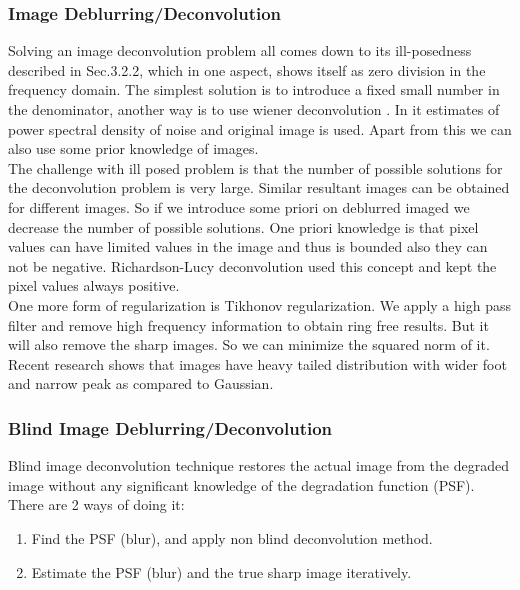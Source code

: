 \documentclass{article}
\begin{document}
\subsubsection{Image Deblurring/Deconvolution}
Solving an image deconvolution problem all comes down to its ill-posedness described in Sec.3.2.2, which in one aspect, shows itself as zero division in the frequency domain. The simplest solution is to introduce a fixed small number in the denominator, another way is to use wiener deconvolution \cite{gonzalez-woods}. In it estimates of power spectral density of noise and original image is used. Apart from this we can also use some prior knowledge of images. \\

The challenge with ill posed problem is that the number of possible solutions for the deconvolution problem is very large. Similar resultant images can be obtained for different images. So if we introduce some priori on deblurred imaged we decrease the number of possible solutions. One priori knowledge is that pixel values can have limited values in the image and thus is bounded also they can not be negative. Richardson-Lucy deconvolution used this concept and kept the pixel values always positive. \\

One more form of regularization is Tikhonov regularization. We apply a high pass filter and remove high frequency information to obtain ring free results. But it will also remove the sharp images. So we can minimize the squared norm of it. Recent research shows that images have heavy tailed distribution with wider foot and narrow peak as compared to Gaussian. \\

\subsubsection{Blind Image Deblurring/Deconvolution}
Blind image deconvolution technique restores the actual image from the degraded image without any significant knowledge of the degradation function (PSF). \\

There are 2 ways of doing it: 

\begin{enumerate}
    \item Find the PSF (blur), and apply non blind deconvolution method.
    \item Estimate the PSF (blur) and the true sharp image iteratively.
\end{enumerate}
\end{document}
